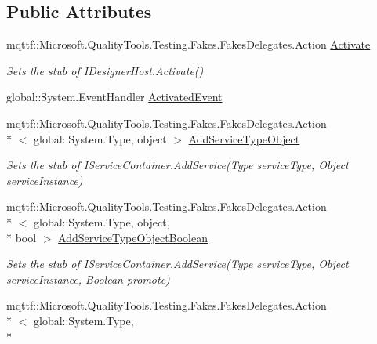 \subsection*{Public Attributes}
\begin{DoxyCompactItemize}
\item 
mqttf\-::\-Microsoft.\-Quality\-Tools.\-Testing.\-Fakes.\-Fakes\-Delegates.\-Action \hyperlink{class_system_1_1_component_model_1_1_design_1_1_fakes_1_1_stub_i_designer_host_a91813b02bbf2d2d790df1fc05c5cbfc1}{Activate}
\begin{DoxyCompactList}\small\item\em Sets the stub of I\-Designer\-Host.\-Activate()\end{DoxyCompactList}\item 
global\-::\-System.\-Event\-Handler \hyperlink{class_system_1_1_component_model_1_1_design_1_1_fakes_1_1_stub_i_designer_host_a1c2ba542209a0167c65a2f90d02c1706}{Activated\-Event}
\item 
mqttf\-::\-Microsoft.\-Quality\-Tools.\-Testing.\-Fakes.\-Fakes\-Delegates.\-Action\\*
$<$ global\-::\-System.\-Type, object $>$ \hyperlink{class_system_1_1_component_model_1_1_design_1_1_fakes_1_1_stub_i_designer_host_a70b9970b06f382a4d821ebd2e800f649}{Add\-Service\-Type\-Object}
\begin{DoxyCompactList}\small\item\em Sets the stub of I\-Service\-Container.\-Add\-Service(\-Type service\-Type, Object service\-Instance)\end{DoxyCompactList}\item 
mqttf\-::\-Microsoft.\-Quality\-Tools.\-Testing.\-Fakes.\-Fakes\-Delegates.\-Action\\*
$<$ global\-::\-System.\-Type, object, \\*
bool $>$ \hyperlink{class_system_1_1_component_model_1_1_design_1_1_fakes_1_1_stub_i_designer_host_a0a7441ee0c7a376bf8aa80c3a9e5b9b9}{Add\-Service\-Type\-Object\-Boolean}
\begin{DoxyCompactList}\small\item\em Sets the stub of I\-Service\-Container.\-Add\-Service(\-Type service\-Type, Object service\-Instance, Boolean promote)\end{DoxyCompactList}\item 
mqttf\-::\-Microsoft.\-Quality\-Tools.\-Testing.\-Fakes.\-Fakes\-Delegates.\-Action\\*
$<$ global\-::\-System.\-Type, \\*

\end{DoxyCompactItemize}
